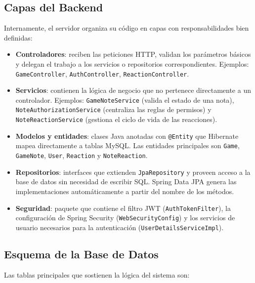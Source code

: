 \subsection{Capas del Backend}

Internamente, el servidor organiza su código en capas con responsabilidades
bien definidas:

\begin{itemize}
    \item \textbf{Controladores}: reciben las peticiones HTTP, validan los
    parámetros básicos y delegan el trabajo a los servicios o repositorios
    correspondientes. Ejemplos: \texttt{GameController},
    \texttt{AuthController}, \texttt{ReactionController}.

    \item \textbf{Servicios}: contienen la lógica de negocio que no pertenece
    directamente a un controlador. Ejemplos: \texttt{GameNoteService} (valida
    el estado de una nota), \texttt{NoteAuthorizationService} (centraliza las
    reglas de permisos) y \texttt{NoteReactionService} (gestiona el ciclo de
    vida de las reacciones).

    \item \textbf{Modelos y entidades}: clases Java anotadas con
    \texttt{@Entity} que Hibernate mapea directamente a tablas MySQL. Las
    entidades principales son \texttt{Game}, \texttt{GameNote}, \texttt{User},
    \texttt{Reaction} y \texttt{NoteReaction}.

    \item \textbf{Repositorios}: interfaces que extienden
    \texttt{JpaRepository} y proveen acceso a la base de datos sin necesidad
    de escribir SQL. Spring Data JPA genera las implementaciones
    automáticamente a partir del nombre de los métodos.

    \item \textbf{Seguridad}: paquete que contiene el filtro JWT
    (\texttt{AuthTokenFilter}), la configuración de Spring Security
    (\texttt{WebSecurityConfig}) y los servicios de usuario necesarios para
    la autenticación (\texttt{UserDetailsServiceImpl}).
\end{itemize}

\subsection{Esquema de la Base de Datos}

Las tablas principales que sostienen la lógica del sistema son:

